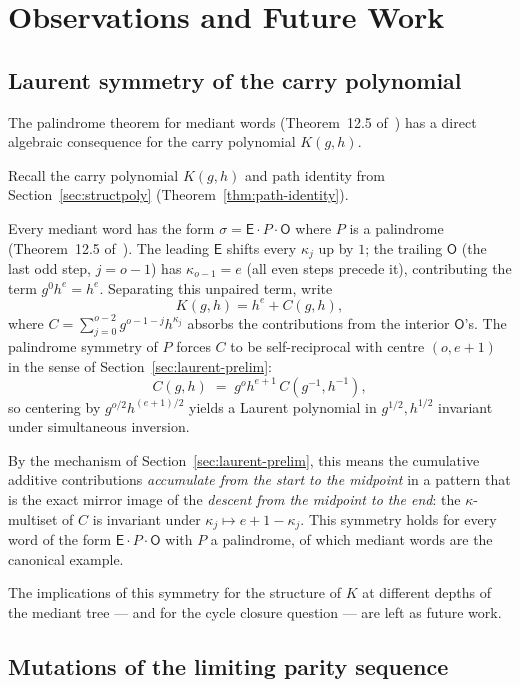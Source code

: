 \documentclass[12pt]{article}
\theoremstyle{definition}
\theoremstyle{remark}
\theoremstyle{plain}
\newcommand{\OO}{\mathsf{O}}
\newcommand{\EE}{\mathsf{E}}
\begin{document}
\section{Observations and Future Work}
\label{sec:future}

\subsection{Laurent symmetry of the carry polynomial}
\label{sec:laurent}

The palindrome theorem for mediant words (Theorem~12.5 of~\cite{paper76}) has a direct
algebraic consequence for the carry polynomial $K(g, h)$.

Recall the carry polynomial $K(g,h)$ and path identity from
Section~\ref{sec:structpoly} (Theorem~\ref{thm:path-identity}).

Every mediant word has the form $\sigma = \EE \cdot P \cdot \OO$ where $P$ is a
palindrome (Theorem~12.5 of~\cite{paper76}).
The leading $\EE$ shifts every $\kappa_j$ up by $1$; the trailing $\OO$ (the last
odd step, $j = o-1$) has $\kappa_{o-1} = e$ (all even steps precede it), contributing
the term $g^0 h^e = h^e$.
Separating this unpaired term, write
\[
  K(g, h) = h^e + C(g, h),
\]
where $C = \sum_{j=0}^{o-2} g^{o-1-j} h^{\kappa_j}$ absorbs the contributions from
the interior $\OO$'s.
The palindrome symmetry of $P$ forces $C$ to be self-reciprocal with centre
$(o, e+1)$ in the sense of Section~\ref{sec:laurent-prelim}:
\[
  C(g, h) \;=\; g^{o} h^{e+1}\, C(g^{-1}, h^{-1}),
\]
so centering by $g^{o/2} h^{(e+1)/2}$ yields a Laurent polynomial in
$g^{1/2}, h^{1/2}$ invariant under simultaneous inversion.

By the mechanism of Section~\ref{sec:laurent-prelim}, this means the cumulative
additive contributions \emph{accumulate from the start to the midpoint} in a
pattern that is the exact mirror image of the \emph{descent from the midpoint to
the end}: the $\kappa$-multiset of $C$ is invariant under
$\kappa_j \mapsto e+1-\kappa_j$.
This symmetry holds for every word of the form $\EE \cdot P \cdot \OO$ with $P$
a palindrome, of which mediant words are the canonical example.

The implications of this symmetry for the structure of $K$ at different depths of the
mediant tree --- and for the cycle closure question --- are left as future work.

\subsection{Mutations of the limiting parity sequence}
\label{sec:perturbation}
\end{document}

